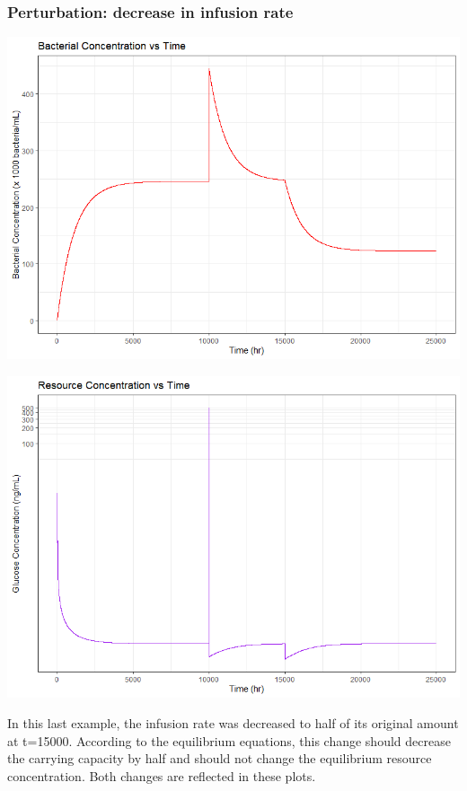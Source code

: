 \documentclass{article}
\begin{document}
\subsubsection{Perturbation: decrease in infusion rate}

\begin{center}

\includegraphics[scale=0.5]{plots/NoPhage_U_perturbed_down.png}

\includegraphics[scale=0.5]{plots/NoPhage_R_perturbed_down.png}
\end{center}

In this last example, the infusion rate was decreased to half of its original amount at t=15000. According to the equilibrium equations, this change should decrease the carrying capacity by half and should not change the equilibrium resource concentration. Both changes are reflected in these plots.
\end{document}
